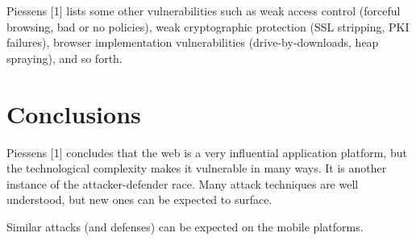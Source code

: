 Piessens [1] lists some other vulnerabilities such as weak access control (forceful browsing, bad or no policies), weak cryptographic protection (SSL stripping, PKI failures), browser implementation vulnerabilities (drive-by-downloads, heap spraying), and so forth.




\section{Conclusions}

Piessens [1] concludes that the web is a very influential application platform, but the technological complexity makes it vulnerable in many ways. It is another instance of the attacker-defender race. Many attack techniques are well understood, but new ones can be expected to surface.

Similar attacks (and defenses) can be expected on the mobile platforms.



